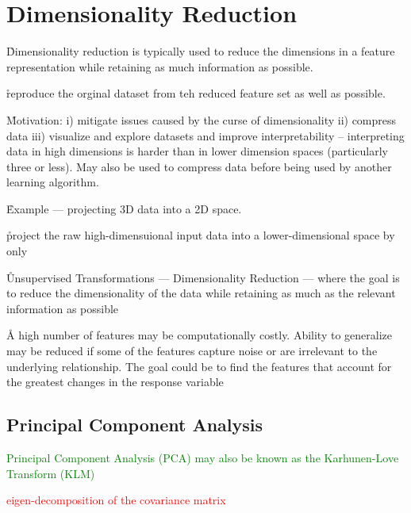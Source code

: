 \section{Dimensionality Reduction}
\label{unsupervised_dimensionality_reduction}

\r{Dimensionality reduction is typically used to reduce the dimensions in a feature representation while retaining as much information as possible.}

\r{reproduce the orginal dataset from teh reduced feature set as well as possible.}

\r{Motivation: i) mitigate issues caused by the curse of dimensionality ii) compress data iii) visualize and explore datasets and improve interpretability -- interpreting data in high dimensions is harder than in lower dimension spaces (particularly three or less). May also be used to compress data before being used by another learning algorithm.}

\r{Example --- projecting 3D data into a 2D space.}

\r{project the raw high-dimensuional input data into  a lower-dimensional space by only }


\r{Unsupervised Transformations --- Dimensionality Reduction --- where the goal is to reduce the dimensionality of the data while retaining as much as the relevant information as possible}


\r{A high number of features may be computationally costly. Ability to generalize may be reduced if some of the features capture noise or are irrelevant to the underlying relationship. The goal could be to find the features that account for the greatest changes in the response variable}

\subsection{Principal Component Analysis}

\textcolor{green}{{Principal Component Analysis (PCA)} may also be known as the {Karhunen-Love Transform (KLM)} }

\textcolor{red}{eigen-decomposition of the covariance matrix}

